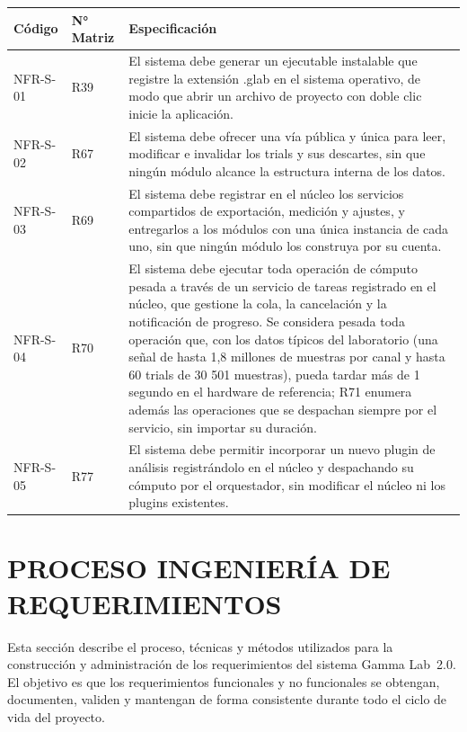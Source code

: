 \documentclass[12pt, letterpaper]{article}
\begin{document}
\begin{longtable}{|p{2.5cm}|p{2.5cm}|p{10.1cm}|}
\hline
\rowcolor{gray!25}
\textbf{Código} & \textbf{N° Matriz} & \textbf{Especificación} \\
\hline
\endhead

\hline
\endlastfoot

NFR-S-01 & R39 & El sistema debe generar un ejecutable instalable que registre la extensión .glab en el sistema operativo, de modo que abrir un archivo de proyecto con doble clic inicie la aplicación. \\
\hline
NFR-S-02 & R67 & El sistema debe ofrecer una vía pública y única para leer, modificar e invalidar los trials y sus descartes, sin que ningún módulo alcance la estructura interna de los datos. \\
\hline
NFR-S-03 & R69 & El sistema debe registrar en el núcleo los servicios compartidos de exportación, medición y ajustes, y entregarlos a los módulos con una única instancia de cada uno, sin que ningún módulo los construya por su cuenta. \\
\hline
NFR-S-04 & R70 & El sistema debe ejecutar toda operación de cómputo pesada a través de un servicio de tareas registrado en el núcleo, que gestione la cola, la cancelación y la notificación de progreso. Se considera pesada toda operación que, con los datos típicos del laboratorio (una señal de hasta 1,8 millones de muestras por canal y hasta 60 trials de 30 501 muestras), pueda tardar más de 1 segundo en el hardware de referencia; R71 enumera además las operaciones que se despachan siempre por el servicio, sin importar su duración. \\
\hline
NFR-S-05 & R77 & El sistema debe permitir incorporar un nuevo plugin de análisis registrándolo en el núcleo y despachando su cómputo por el orquestador, sin modificar el núcleo ni los plugins existentes. \\

\end{longtable}
\vspace{-0.5em}
\label{tab:nfr-s}


\section{PROCESO INGENIERÍA DE REQUERIMIENTOS}

Esta sección describe el proceso, técnicas y métodos utilizados para la construcción y
administración de los requerimientos del sistema Gamma Lab~2.0. El objetivo es que los
requerimientos funcionales y no funcionales se obtengan, documenten, validen y
mantengan de forma consistente durante todo el ciclo de vida del proyecto.
\end{document}
